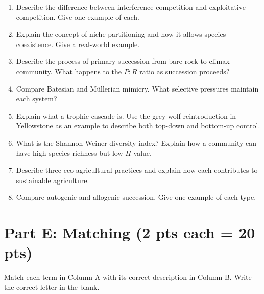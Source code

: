 \documentclass[11pt]{article}
\begin{document}
\begin{enumerate}[label=\textbf{\arabic*.}]
  \item Describe the difference between interference competition and exploitative competition. Give one example of each.
  \vspace{2cm}

  \item Explain the concept of niche partitioning and how it allows species coexistence. Give a real-world example.
  \vspace{2cm}

  \item Describe the process of primary succession from bare rock to climax community. What happens to the $P\!:\!R$ ratio as succession proceeds?
  \vspace{2cm}

  \item Compare Batesian and M\"{u}llerian mimicry. What selective pressures maintain each system?
  \vspace{2cm}

  \item Explain what a trophic cascade is. Use the grey wolf reintroduction in Yellowstone as an example to describe both top-down and bottom-up control.
  \vspace{2cm}

  \item What is the Shannon-Weiner diversity index? Explain how a community can have high species richness but low $H$ value.
  \vspace{2cm}

  \item Describe three eco-agricultural practices and explain how each contributes to sustainable agriculture.
  \vspace{2cm}

  \item Compare autogenic and allogenic succession. Give one example of each type.
  \vspace{2cm}
\end{enumerate}

\clearpage

\section*{Part E: Matching (2 pts each = 20 pts)}
Match each term in Column A with its correct description in Column B. Write the correct letter in the blank.
\end{document}
